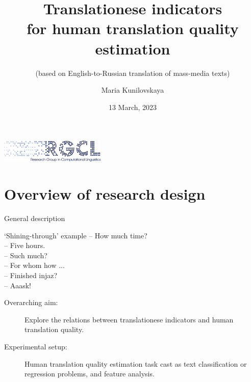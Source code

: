 \documentclass[11pt]{beamer} %
\author{Maria Kunilovskaya}
\title[Translationese indicators for human translation quality estimation]{Translationese indicators \\for human translation quality estimation}
\subtitle{(based on English-to-Russian translation of mass-media texts)}
\institute{University of Wolverhampton}
\date{13 March, 2023}
\begin{document}
	\begin{frame}[plain]

		\includegraphics[width=50mm]{rgcl_logo}%

		\maketitle %
	\end{frame}
	
\section{Overview of research design}

\begin{frame}{General description}
	\begin{exampleblock}{`Shining-through' example}
		\hspace{5em} -- How much time? \\
		\hspace{5em} -- Five hours. \\
		\hspace{5em} -- Such much? \\
		\hspace{5em} -- For whom how ... \\
		\hspace{5em} -- Finished injaz? \\
		\hspace{5em}  -- Aaask!
	\end{exampleblock}

\begin{description}
	\item[Overarching aim:] Explore the relations between translationese indicators and human translation quality.    
	\item[Experimental setup:] Human translation quality estimation task cast as text classification or regression problems, and feature analysis.
\end{description}
\end{frame}	
\end{document}
